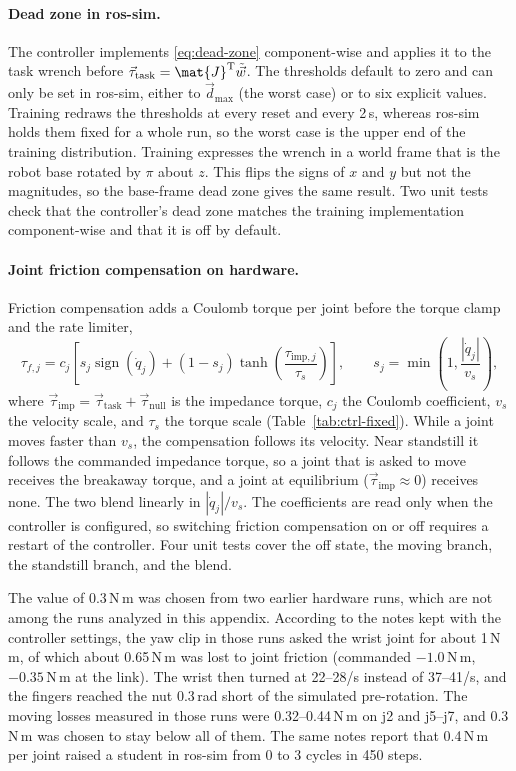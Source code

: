 \paragraph{Dead zone in ros-sim.} The controller implements \eqref{eq:dead-zone} component-wise and applies it to the task wrench before $\vec{\tau}_{\mathrm{task}}=\mat{J}^{\mathrm{T}}\tilde{\vec{w}}$. The thresholds default to zero and can only be set in ros-sim, either to $\vec{d}_{\max}$ (the worst case) or to six explicit values. Training redraws the thresholds at every reset and every 2\,s, whereas ros-sim holds them fixed for a whole run, so the worst case is the upper end of the training distribution. Training expresses the wrench in a world frame that is the robot base rotated by $\pi$ about $z$. This flips the signs of $x$ and $y$ but not the magnitudes, so the base-frame dead zone gives the same result. Two unit tests check that the controller's dead zone matches the training implementation component-wise and that it is off by default.

\paragraph{Joint friction compensation on hardware.} Friction compensation adds a Coulomb torque per joint before the torque clamp and the rate limiter,
\begin{equation}\label{eq:friction-ff}
  \tau_{f,j}=c_j\left[s_j\operatorname{sign}(\dot{q}_j)+(1-s_j)\tanh\!\left(\frac{\tau_{\mathrm{imp},j}}{\tau_s}\right)\right],\qquad s_j=\min\!\left(1,\frac{|\dot{q}_j|}{v_s}\right),
\end{equation}
where $\vec{\tau}_{\mathrm{imp}}=\vec{\tau}_{\mathrm{task}}+\vec{\tau}_{\mathrm{null}}$ is the impedance torque, $c_j$ the Coulomb coefficient, $v_s$ the velocity scale, and $\tau_s$ the torque scale (Table~\ref{tab:ctrl-fixed}). While a joint moves faster than $v_s$, the compensation follows its velocity. Near standstill it follows the commanded impedance torque, so a joint that is asked to move receives the breakaway torque, and a joint at equilibrium ($\vec{\tau}_{\mathrm{imp}}\approx0$) receives none. The two blend linearly in $|\dot{q}_j|/v_s$. The coefficients are read only when the controller is configured, so switching friction compensation on or off requires a restart of the controller. Four unit tests cover the off state, the moving branch, the standstill branch, and the blend.

The value of 0.3\,N\,m was chosen from two earlier hardware runs, which are not among the runs analyzed in this appendix. According to the notes kept with the controller settings, the yaw clip in those runs asked the wrist joint for about 1\,N\,m, of which about 0.65\,N\,m was lost to joint friction (commanded $-1.0$\,N\,m, $-0.35$\,N\,m at the link). The wrist then turned at 22--28\degree/s instead of 37--41\degree/s, and the fingers reached the nut 0.3\,rad short of the simulated pre-rotation. The moving losses measured in those runs were 0.32--0.44\,N\,m on j2 and j5--j7, and 0.3\,N\,m was chosen to stay below all of them. The same notes report that 0.4\,N\,m per joint raised a student in ros-sim from 0 to 3 cycles in 450 steps.

